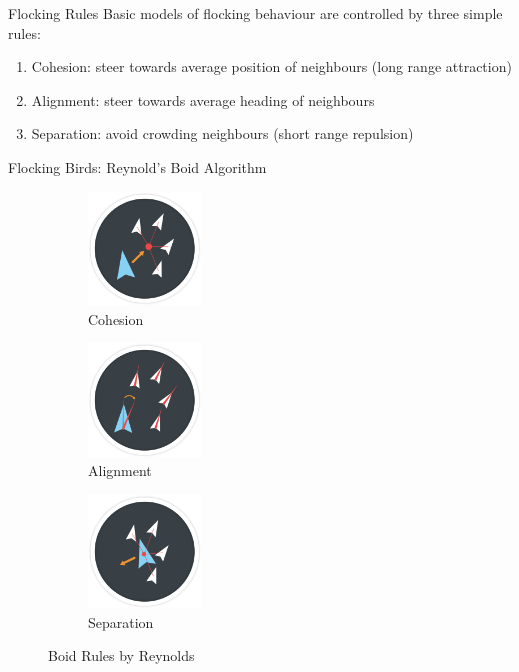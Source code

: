 \documentclass[handout]{beamer}
\begin{document}
\begin{frame}{Flocking Rules}
Basic models of flocking behaviour are controlled by three simple rules:
\begin{enumerate}
\item Cohesion: steer towards average position of neighbours (long range attraction)
\item Alignment: steer towards average heading of neighbours
\item Separation: avoid crowding neighbours (short range repulsion)

\end{enumerate}
\citep{reynolds1987flocks}
\end{frame}

\begin{frame}{Flocking Birds: Reynold's Boid Algorithm}
\begin{figure}
  \begin{center}
  \begin{subfigure}[b]{0.3\textwidth}
  \includegraphics[width=3cm]{images/boid01-cohesion.png}
  \caption{Cohesion}
  \end{subfigure}
    \begin{subfigure}[b]{0.3\textwidth}
    \includegraphics[width=3cm]{images/boid02-alignment.png}
  \caption{Alignment}
    \end{subfigure}
    \begin{subfigure}[b]{0.3\textwidth}
    \includegraphics[width=3cm]{images/boid03-separation.png}
  \caption{Separation}
    \end{subfigure}
  \label{fig:boid01}
 \end{center}  
\caption{Boid Rules by Reynolds}
\label{fig:boidRules}  
\end{figure}
\citep{aprk2014boid}
\end{frame}
\end{document}

